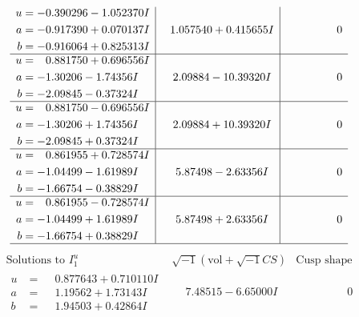 \documentclass[1p]{elsarticle_modified}
\theoremstyle{definition}
\newcommand{\I}{\sqrt{-1}}
\begin{document}
$$\begin{array}{c|c|c}
\begin{aligned}
u &= -0.390296 - 1.052370 I \\
a &= -0.917390 + 0.070137 I \\
b &= -0.916064 + 0.825313 I\end{aligned}
 & \phantom{-}1.057540 + 0.415655 I & \phantom{-0.000000 } 0 \\ \hline\begin{aligned}
u &= \phantom{-}0.881750 + 0.696556 I \\
a &= -1.30206 - 1.74356 I \\
b &= -2.09845 - 0.37324 I\end{aligned}
 & \phantom{-}2.09884 - 10.39320 I & \phantom{-0.000000 } 0 \\ \hline\begin{aligned}
u &= \phantom{-}0.881750 - 0.696556 I \\
a &= -1.30206 + 1.74356 I \\
b &= -2.09845 + 0.37324 I\end{aligned}
 & \phantom{-}2.09884 + 10.39320 I & \phantom{-0.000000 } 0 \\ \hline\begin{aligned}
u &= \phantom{-}0.861955 + 0.728574 I \\
a &= -1.04499 - 1.61989 I \\
b &= -1.66754 - 0.38829 I\end{aligned}
 & \phantom{-}5.87498 - 2.63356 I & \phantom{-0.000000 } 0 \\ \hline\begin{aligned}
u &= \phantom{-}0.861955 - 0.728574 I \\
a &= -1.04499 + 1.61989 I \\
b &= -1.66754 + 0.38829 I\end{aligned}
 & \phantom{-}5.87498 + 2.63356 I & \phantom{-0.000000 } 0\\
 \hline 
 \end{array}$$\newpage$$\begin{array}{c|c|c}  
\text{Solutions to }I^u_{1}& \I (\text{vol} + \sqrt{-1}CS) & \text{Cusp shape}\\
 \hline 
\begin{aligned}
u &= \phantom{-}0.877643 + 0.710110 I \\
a &= \phantom{-}1.19562 + 1.73143 I \\
b &= \phantom{-}1.94503 + 0.42864 I\end{aligned}
 & \phantom{-}7.48515 - 6.65000 I & \phantom{-0.000000 } 0 \\ \hline\begin{aligned}

\end{aligned}
\end{array}$$
\end{document}
